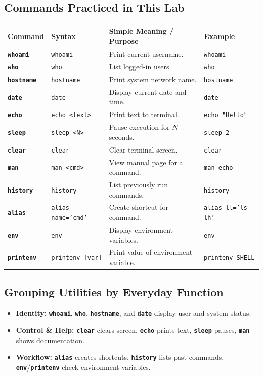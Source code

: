 \documentclass[10pt,a4paper]{article}
\newcommand{\cmd}[1]{\texttt{\textbf{#1}}}
\begin{document}
\subsection{Commands Practiced in This Lab}
\vspace{-2pt}
\begin{table}[h!]
\centering\footnotesize
\renewcommand{\arraystretch}{1.05}
\begin{tabularx}{\linewidth}{llp{5.5cm}X}
\toprule
\textbf{Command} & \textbf{Syntax} & \textbf{Simple Meaning / Purpose} & \textbf{Example} \\
\midrule
\cmd{whoami} & \texttt{whoami} & Print current username. & \texttt{whoami} \\
\cmd{who} & \texttt{who} & List logged-in users. & \texttt{who} \\
\cmd{hostname} & \texttt{hostname} & Print system network name. & \texttt{hostname} \\
\cmd{date} & \texttt{date} & Display current date and time. & \texttt{date} \\
\cmd{echo} & \texttt{echo <text>} & Print text to terminal. & \texttt{echo "Hello"} \\
\cmd{sleep} & \texttt{sleep <N>} & Pause execution for $N$ seconds. & \texttt{sleep 2} \\
\cmd{clear} & \texttt{clear} & Clear terminal screen. & \texttt{clear} \\
\cmd{man} & \texttt{man <cmd>} & View manual page for a command. & \texttt{man echo} \\
\cmd{history} & \texttt{history} & List previously run commands. & \texttt{history} \\
\cmd{alias} & \texttt{alias name='cmd'} & Create shortcut for command. & \texttt{alias ll='ls -lh'} \\
\cmd{env} & \texttt{env} & Display environment variables. & \texttt{env} \\
\cmd{printenv} & \texttt{printenv [var]} & Print value of environment variable. & \texttt{printenv SHELL} \\
\bottomrule
\end{tabularx}
\end{table}
\vspace{-6pt}

\subsection{Grouping Utilities by Everyday Function}
\begin{itemize}[noitemsep,topsep=1pt,leftmargin=1.2em]
  \item \textbf{Identity:} \cmd{whoami}, \cmd{who}, \cmd{hostname}, and \cmd{date} display user and system status.
  \item \textbf{Control \& Help:} \cmd{clear} clears screen, \cmd{echo} prints text, \cmd{sleep} pauses, \cmd{man} shows documentation.
  \item \textbf{Workflow:} \cmd{alias} creates shortcuts, \cmd{history} lists past commands, \cmd{env}/\cmd{printenv} check environment variables.
\end{itemize}
\vspace{-6pt}
\end{document}
